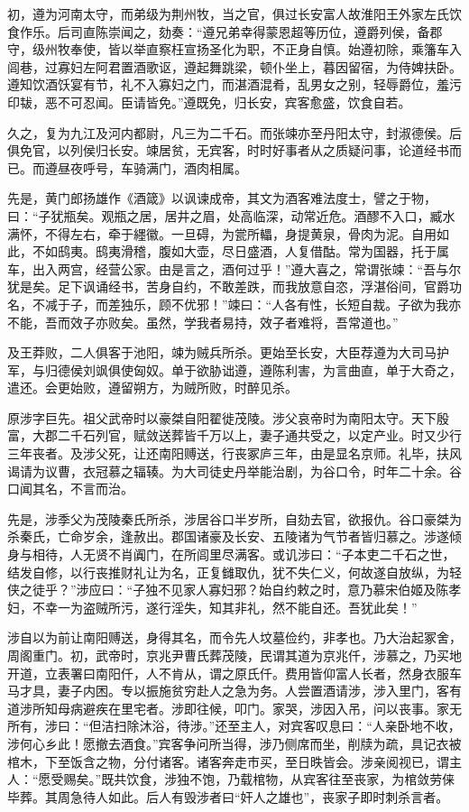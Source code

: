 \documentclass[12pt,UTF8]{ctexbook}
\begin{document}
初，遵为河南太守，而弟级为荆州牧，当之官，俱过长安富人故淮阳王外家左氏饮食作乐。后司直陈崇闻之，劾奏：“遵兄弟幸得蒙恩超等历位，遵爵列侯，备郡守，级州牧奉使，皆以举直察枉宣扬圣化为职，不正身自慎。始遵初除，乘籓车入闾巷，过寡妇左阿君置酒歌讴，遵起舞跳梁，顿仆坐上，暮因留宿，为侍婢扶卧。遵知饮酒饫宴有节，礼不入寡妇之门，而湛酒混肴，乱男女之别，轻辱爵位，羞污印韨，恶不可忍闻。臣请皆免。”遵既免，归长安，宾客愈盛，饮食自若。



久之，复为九江及河内都尉，凡三为二千石。而张竦亦至丹阳太守，封淑德侯。后俱免官，以列侯归长安。竦居贫，无宾客，时时好事者从之质疑问事，论道经书而已。而遵昼夜呼号，车骑满门，酒肉相属。



先是，黄门郎扬雄作《酒箴》以讽谏成帝，其文为酒客难法度士，譬之于物，曰：“子犹瓶矣。观瓶之居，居井之眉，处高临深，动常近危。酒醪不入口，臧水满怀，不得左右，牵于纆徽。一旦碍，为瓽所轠，身提黄泉，骨肉为泥。自用如此，不如鸱夷。鸱夷滑稽，腹如大壶，尽日盛酒，人复借酤。常为国器，托于属车，出入两宫，经营公家。由是言之，酒何过乎！”遵大喜之，常谓张竦：“吾与尔犹是矣。足下讽诵经书，苦身自约，不敢差跌，而我放意自恣，浮湛俗间，官爵功名，不减于子，而差独乐，顾不优邪！”竦曰：“人各有性，长短自裁。子欲为我亦不能，吾而效子亦败矣。虽然，学我者易持，效子者难将，吾常道也。”



及王莽败，二人俱客于池阳，竦为贼兵所杀。更始至长安，大臣荐遵为大司马护军，与归德侯刘飒俱使匈奴。单于欲胁诎遵，遵陈利害，为言曲直，单于大奇之，遣还。会更始败，遵留朔方，为贼所败，时醉见杀。



原涉字巨先。祖父武帝时以豪桀自阳翟徙茂陵。涉父哀帝时为南阳太守。天下殷富，大郡二千石列官，赋敛送葬皆千万以上，妻子通共受之，以定产业。时又少行三年丧者。及涉父死，让还南阳赙送，行丧冢庐三年，由是显名京师。礼毕，扶风谒请为议曹，衣冠慕之辐辏。为大司徒史丹举能治剧，为谷口令，时年二十余。谷口闻其名，不言而治。



先是，涉季父为茂陵秦氏所杀，涉居谷口半岁所，自劾去官，欲报仇。谷口豪桀为杀秦氏，亡命岁余，逢赦出。郡国诸豪及长安、五陵诸为气节者皆归慕之。涉遂倾身与相待，人无贤不肖阗门，在所闾里尽满客。或讥涉曰：“子本吏二千石之世，结发自修，以行丧推财礼让为名，正复雠取仇，犹不失仁义，何故遂自放纵，为轻侠之徒乎？”涉应曰：“子独不见家人寡妇邪？始自约敕之时，意乃慕宋伯姬及陈孝妇，不幸一为盗贼所污，遂行淫失，知其非礼，然不能自还。吾犹此矣！”



涉自以为前让南阳赙送，身得其名，而令先人坟墓俭约，非孝也。乃大治起冢舍，周阁重门。初，武帝时，京兆尹曹氏葬茂陵，民谓其道为京兆仟，涉慕之，乃买地开道，立表署曰南阳仟，人不肯从，谓之原氏仟。费用皆仰富人长者，然身衣服车马才具，妻子内困。专以振施贫穷赴人之急为务。人尝置酒请涉，涉入里门，客有道涉所知母病避疾在里宅者。涉即往候，叩门。家哭，涉因入吊，问以丧事。家无所有，涉曰：“但洁扫除沐浴，待涉。”还至主人，对宾客叹息曰：“人亲卧地不收，涉何心乡此！愿撤去酒食。”宾客争问所当得，涉乃侧席而坐，削牍为疏，具记衣被棺木，下至饭含之物，分付诸客。诸客奔走市买，至日昳皆会。涉亲阅视已，谓主人：“愿受赐矣。”既共饮食，涉独不饱，乃载棺物，从宾客往至丧家，为棺敛劳俫毕葬。其周急待人如此。后人有毁涉者曰“奸人之雄也”，丧家子即时刺杀言者。
\end{document}
